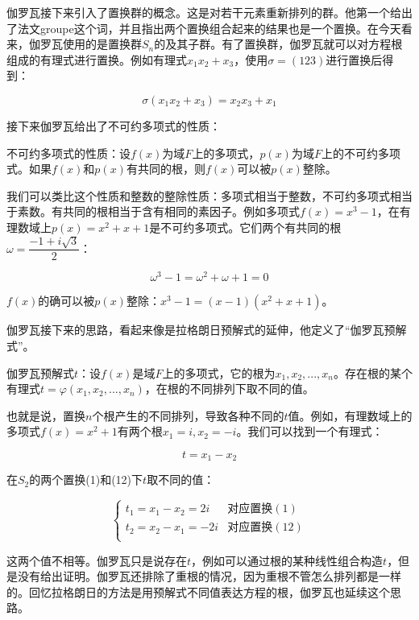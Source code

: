 \documentclass[b5paper]{ctexart}
\begin{document}
伽罗瓦接下来引入了置换群的概念。这是对若干元素重新排列的群。他第一个给出了法文groupe这个词，并且指出两个置换组合起来的结果也是一个置换。在今天看来，伽罗瓦使用的是置换群$S_n$的及其子群。有了置换群，伽罗瓦就可以对方程根组成的有理式进行置换。例如有理式$x_1 x_2 + x_3$，使用$\sigma = (123)$进行置换后得到：

\[
\sigma(x_1 x_2 + x_3) = x_2 x_3 + x_1
\]

接下来伽罗瓦给出了不可约多项式的性质：

\begin{lemma}不可约多项式的性质：设$f(x)$为域$F$上的多项式，$p(x)$为域$F$上的不可约多项式。如果$f(x)$和$p(x)$有共同的根，则$f(x)$可以被$p(x)$整除。
\end{lemma}

我们可以类比这个性质和整数的整除性质：多项式相当于整数，不可约多项式相当于素数。有共同的根相当于含有相同的素因子。例如多项式$f(x) = x^3 - 1$，在有理数域上$p(x) = x^2 + x + 1$是不可约多项式。它们两个有共同的根$\omega = \dfrac{-1 + i\sqrt{3}}{2}$：

\[
\omega^3 - 1 = \omega^2 + \omega + 1 = 0
\]

$f(x)$的确可以被$p(x)$整除：$x^3 - 1 = (x - 1)(x^2 + x + 1)$。

伽罗瓦接下来的思路，看起来像是拉格朗日预解式的延伸，他定义了“伽罗瓦预解式”。

\begin{lemma}伽罗瓦预解式$t$：设$f(x)$是域$F$上的多项式，它的根为$x_1, x_2, ..., x_n$。存在根的某个有理式$t = \varphi(x_1, x_2, ..., x_n)$，在根的不同排列下取不同的值。
\end{lemma}

也就是说，置换$n$个根产生的不同排列，导致各种不同的$t$值。例如，有理数域上的多项式$f(x) = x^2 + 1$有两个根$x_1 = i, x_2 = -i$。我们可以找到一个有理式：

\[
t = x_1 - x_2
\]

在$S_2$的两个置换(1)和(12)下$t$取不同的值：

\[
\begin{cases}
t_1 = x_1 - x_2 = 2i & \text{对应置换} (1) \\
t_2 = x_2 - x_1 = -2i & \text{对应置换} (12) \\
\end{cases}
\]

这两个值不相等。伽罗瓦只是说存在$t$，例如可以通过根的某种线性组合构造$t$，但是没有给出证明。伽罗瓦还排除了重根的情况，因为重根不管怎么排列都是一样的。回忆拉格朗日的方法是用预解式不同值表达方程的根，伽罗瓦也延续这个思路。
\end{document}
